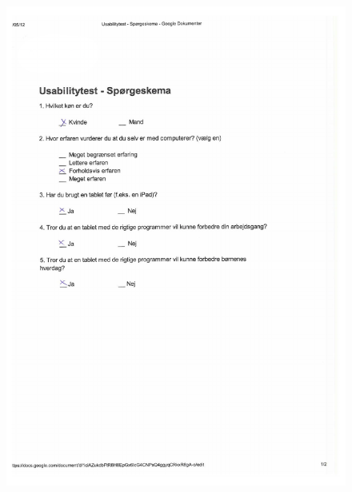 \begin{figure}[H]
	\centering
		\includegraphics{Appendix/demo_ma1.pdf}
	\label{fig:demo_t9}
\end{figure}

